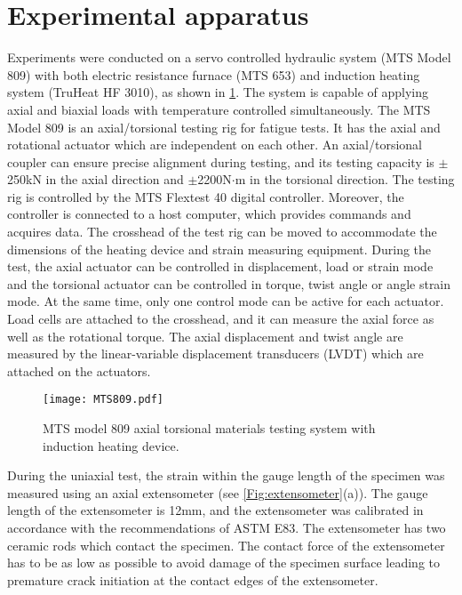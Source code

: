 \section{Experimental apparatus}
\noindent
Experiments were conducted on a servo controlled hydraulic system (MTS Model 809) with both electric resistance furnace (MTS 653) and induction heating system (TruHeat HF 3010), as shown in \ref{Fig:MTS809}.
The system is capable of applying axial and biaxial loads with temperature controlled simultaneously.
The MTS Model 809 is an axial/torsional testing rig for fatigue tests. It has the axial and rotational actuator which are independent on each other.
An axial/torsional coupler can ensure precise alignment during testing, and its testing capacity is $\pm$250kN in the axial direction and $\pm$2200N$\cdot$m in the torsional direction.
The testing rig is controlled by the MTS Flextest 40 digital controller. Moreover, the controller is connected to a host computer, which provides commands and acquires data.
The crosshead of the test rig can be moved to accommodate the dimensions of the heating device and strain measuring equipment.
During the test, the axial actuator can be controlled in displacement, load or strain mode and the torsional actuator can be controlled in torque, twist angle or angle strain mode.
At the same time, only one control mode can be active for each actuator.
Load cells are attached to the crosshead, and it can measure the axial force as well as the rotational torque.
The axial displacement and twist angle are measured by the linear-variable displacement transducers (LVDT) which are attached on the actuators.

\begin{figure}[!htp]
  \centering
  \texttt{[image: MTS809.pdf]}
\caption{MTS model 809 axial torsional materials testing system with induction heating device.}
\label{Fig:MTS809}
\end{figure}

During the uniaxial test, the strain within the gauge length of the specimen was measured using an axial extensometer (see \ref{Fig:extensometer}(a)).
The gauge length of the extensometer is 12mm, and the extensometer was calibrated in accordance with the recommendations of ASTM E83.
The extensometer has two ceramic rods which contact the specimen.
The contact force of the extensometer has to be as low as possible to avoid damage of the specimen surface leading to premature crack initiation at the contact edges of the extensometer.

